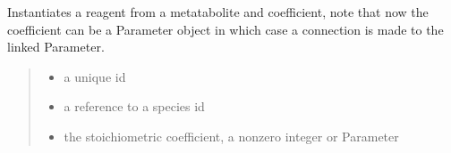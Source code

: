 \documentclass[letterpaper,12pt,english]{sphinxmanual}
\begin{document}
\begin{fulllineitems}

\begin{fulllineitems}
\label{\detokenize{api/core:cbmpy.CBModel.Reagent.__init__}}
\pysigstartsignatures
\pysiglinewithargsret
{}
{\sphinxparamcomma {}\sphinxparamcomma {}}
{}
\pysigstopsignatures
\sphinxAtStartPar
Instantiates a reagent from a metatabolite and coefficient, note that now the coefficient can be a Parameter object in which case a connection is made to the linked Parameter.
\begin{quote}\begin{description}
\begin{itemize}
\item {} 
\sphinxAtStartPar
{} \textendash{} a unique id

\item {} 
\sphinxAtStartPar
{} \textendash{} a reference to a species id

\item {} 
\sphinxAtStartPar
{} \textendash{} the stoichiometric coefficient, a non\sphinxhyphen{}zero integer or Parameter

\end{itemize}

\end{description}\end{quote}

\end{fulllineitems}


\begin{fulllineitems}
\label{\detokenize{api/core:cbmpy.CBModel.Reagent.species_ref}}
\pysigstartsignatures
\pysigline
{}
\pysigstopsignatures
\end{fulllineitems}



\end{fulllineitems}
\end{document}
